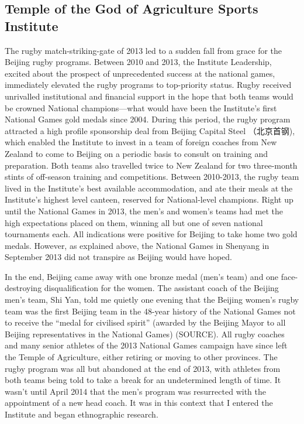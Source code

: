 \begin{CJK}{UTF8}{gbsn}
\subsection{Temple of the God of Agriculture Sports Institute}
The rugby match-striking-gate of 2013 led to a sudden fall from grace for the Beijing rugby programs.  Between 2010 and 2013, the Institute Leadership, excited about the prospect of unprecedented success at the national games,  immediately elevated the rugby programs to top-priority status.  Rugby received unrivalled institutional and financial support in the hope that both teams would be crowned National champions---what would have been the Institute's first National Games gold medals since 2004.  During this period, the rugby program attracted a high profile sponsorship deal from Beijing Capital Steel （北京首钢), which enabled the Institute to invest in a team of foreign coaches from New Zealand to come to Beijing on a periodic basis to consult on training and preparation. Both teams also travelled twice to New Zealand for two three-month stints of off-season training and competitions.  Between 2010-2013, the rugby team lived in the Institute's best available accommodation, and ate their meals at the Institute's highest level canteen, reserved for National-level champions.  Right up until the National Games in 2013, the men's and women's teams had met the high expectations placed on them, winning all but one of seven national tournaments each.  All indications were positive for Beijing to take home two gold medals.  However, as explained above, the National Games in Shenyang in September 2013 did not transpire as Beijing would have hoped.

In the end, Beijing came away with one bronze medal (men's team) and one face-destroying disqualification for the women.  The assistant coach of the Beijing men's team, Shi Yan, told me quietly one evening that the Beijing women's rugby team was the first Beijing team in the 48-year history of the National Games not to receive the ``medal for civilised spirit''  (awarded by the Beijing Mayor to all Beijing representatives in the National Games) (SOURCE).  All rugby coaches and many senior athletes of the 2013 National Games campaign have since left the Temple of Agriculture, either retiring or moving to other provinces.  The rugby program was all but abandoned at the end of 2013, with athletes from both teams being told to take a break for an undetermined length of time.  It wasn't until April 2014 that the men's program was resurrected with the appointment of a new head coach.  It was in this context that I entered the Institute and began ethnographic research.




\end{CJK}
